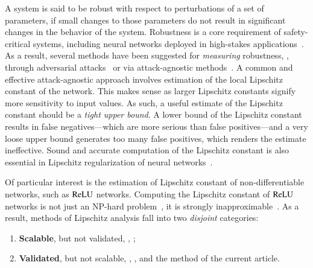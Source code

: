 \documentclass[11pt,times]{article}
\begin{document}
A system is said to be robust with respect to perturbations of a set
of parameters, if small changes to those parameters do not result in
significant changes in the behavior of the system. Robustness is a
core requirement of safety-critical systems, including neural networks
deployed in high-stakes
applications~\parencite{Dietterich:Robust_AI:2017,Heaven:AI_Easy_to_Fool:2019}. As
a result, several methods have been suggested for \emph{measuring}
robustness, {\eg}, through adversarial
attacks~\parencite{Goodfellow:Adversarial_Examples:2015,Carlini_Wagner:Towards_Robustness:2017}
or via attack-agnostic
methods~\parencite{Hein_Andriushchenko:Robustness:2017,Weng_et_al-CLEVER-ICLR:2018,Ko_et_al:POPQOEN:2019,Jordan_Dimakis:Exactly_NeurIPS:2020,Jordan_Dimakis:Provable_ICML:2021}. A
common and effective attack-agnostic approach involves estimation of
the local Lipschitz constant of the network. This makes sense as
larger Lipschitz constants signify more sensitivity to input values.
As such, a useful estimate of the Lipschitz constant should be a
\emph{tight upper bound}. A lower bound of the Lipschitz constant
results in false negatives---which are more serious than false
positives---and a very loose upper bound generates too many false
positives, which renders the estimate ineffective. Sound and accurate
computation of the Lipschitz constant is also essential in Lipschitz
regularization of neural
networks~\parencite{Araujo:Toeplitz:2021,Pauli_et_al:Lipschitz_Bounds:2022}.

Of particular interest is the estimation of Lipschitz constant of
non-differentiable networks, such as $\operatorname{\mathrm{ReLU}}$ networks. Computing the
Lipschitz constant of $\operatorname{\mathrm{ReLU}}$ networks is not just an NP-hard
problem~\parencite{Virmaux_Scaman:Lipschitz_regularity:2018}, it is
strongly
inapproximable~\parencite[Theorem~4]{Jordan_Dimakis:Exactly_NeurIPS:2020}. As
a result, methods of Lipschitz analysis fall into two \emph{disjoint}
categories:


\begin{enumerate}[label=(\arabic*)]
\item \textbf{Scalable}, but not validated, {\eg},
  \parencite{Weng_et_al-CLEVER-ICLR:2018,Chen_et_al:Semialgebraic_Lipschitz:2020,Latorre_et_al:Lipschitz:2020};

\item \textbf{Validated}, but not scalable, {\eg},
  \parencite{Hein_Andriushchenko:Robustness:2017,Jordan_Dimakis:Exactly_NeurIPS:2020,Jordan_Dimakis:Provable_ICML:2021},
  and the method of the current article.

\end{enumerate}
\end{document}
